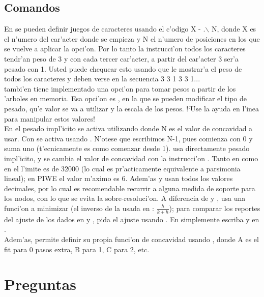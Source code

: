 \subsection{Comandos}
En  se pueden definir juegos de caracteres usando el c'odigo X - .$\backslash$ N, donde X es el n'umero del car'acter donde se empieza y N el n'umero de posiciones en los que se vuelve a aplicar la opci'on. Por lo tanto la instrucci'on  todos los caracteres tendr'an peso de 3 y con  cada tercer car'acter, a partir del car'acter 3 ser'a pesado con 1. Usted puede chequear esto usando  que le mostrar'a el peso de todos los caracteres y deben verse en la secuencia 3 3 1 3 3 1...\\
 tambi'en tiene implementado una opci'on para tomar pesos a partir de los 'arboles en memoria. Esa opci'on es , en la que se pueden modificar el tipo de pesado, qu'e valor se va a utilizar y la escala de los pesos. !`Use la ayuda en l'inea para manipular estos valores!\\
En  el pesado impl'icito se activa utilizando  donde N es el valor de concavidad a usar. Con  se activa usando . N'otese que escribimos N-1, pues  comienza con 0 y suma uno (t'ecnicamente es como comenzar desde 1).  usa directamente pesado impl'icito, y se cambia el valor de concavidad con la instrucci'on . Tanto en  como en  el l'imite es de 32000 (lo cual es pr'acticamente equivalente a parsimonia lineal); en PIWE el valor m'aximo es 6. Adem'as  y  usan todos los valores decimales, por lo cual es recomendable recurrir a alguna medida de soporte para los nodos, con lo que se evita la sobre-resoluci'on. A diferencia de  y ,  usa una funci'on a minimizar (el inverso de la usada en : $\frac{h}{k + h}$); para comparar los reportes del ajuste de los dados en  y , pida el ajuste usando .  En  simplemente escriba  y en  .\\
Adem'as,  permite definir su propia funci'on de concavidad usando , donde A es el fit para 0 pasos extra, B para 1, C para 2, etc.
\section{Preguntas}
